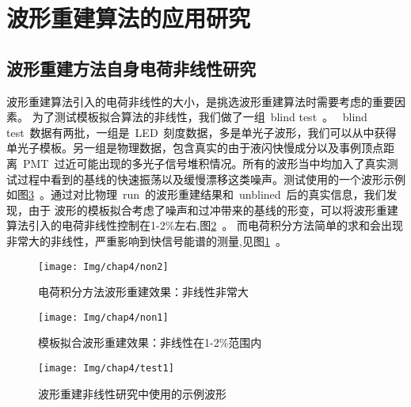 \section{波形重建算法的应用研究}
\subsection{波形重建方法自身电荷非线性研究}
波形重建算法引入的电荷非线性的大小，是挑选波形重建算法时需要考虑的重要因素。
为了测试模板拟合算法的非线性，我们做了一组~blind test~。
~blind test~数据有两批，一组是~LED~刻度数据，多是单光子波形，我们可以从中获得单光子模板。另一组是物理数据，包含真实的由于液闪快慢成分以及事例顶点距离~PMT~过近可能出现的多光子信号堆积情况。所有的波形当中均加入了真实测试过程中看到的基线的快速振荡以及缓慢漂移这类噪声。测试使用的一个波形示例如图\ref{fig:test1}~。通过对比物理~run~的波形重建结果和~unblined~后的真实信息，我们发现，由于
波形的模板拟合考虑了噪声和过冲带来的基线的形变，可以将波形重建算法引入的电荷非线性控制在1-2\%左右,图\ref{fig:non1}~。 而电荷积分方法简单的求和会出现非常大的非线性，严重影响到快信号能谱的测量,见图\ref{fig:non2}~。

\begin{figure}[!htb]
  \centering
   \texttt{[image: Img/chap4/non2]}
    \caption{电荷积分方法波形重建效果：非线性非常大}
  \label{fig:non2}
\end{figure}
\begin{figure}[!htb]
  \centering
   \texttt{[image: Img/chap4/non1]}
    \caption{模板拟合波形重建效果：非线性在1-2\%范围内}
  \label{fig:non1}
\end{figure}
\begin{figure}[!htbp]
  \centering
   \texttt{[image: Img/chap4/test1]}
    \caption{波形重建非线性研究中使用的示例波形}
  \label{fig:test1}
\end{figure}

